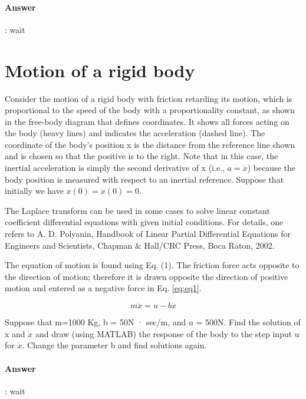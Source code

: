 \documentclass{article}
\begin{document}
\paragraph{Answer}:
wait

\section{Motion of a rigid body}

Consider the motion of a rigid body with friction retarding its motion, which is proportional to the speed of the body with a proportionality constant, as shown in the free-body diagram that defines coordinates. It shows all forces acting on the body (heavy lines) and indicates the acceleration (dashed line). The coordinate of the body's position x is the distance from the reference line shown and is chosen so that the positive is to the right. Note that in this case, the inertial acceleration is simply the second derivative of x (i.e., $a = \ddot{x}$) because the body position is measured with respect to an inertial reference. Suppose that initially we have $x(0) = \dot{x}(0) = 0$.

\begin{tcolorbox}
  The Laplace transform can be used in some cases to solve linear constant coeﬀicient differential equations with given initial conditions. For details, one refers to A. D. Polyanin, Handbook of Linear Partial Differential Equations for Engineers and Scientists, Chapman \& Hall/CRC Press, Boca Raton, 2002.
\end{tcolorbox}

The equation of motion is found using Eq. (1). The friction force acts opposite to the direction of motion; therefore it is drawn opposite the direction of positive motion and entered as a negative force in Eq. \eqref{eq:eq1}.

\begin{equation}
  m\ddot{x} = u - b\dot{x}
  \label{eq:eq1}
\end{equation}

Suppose that m=1000 Kg, b = 50N · sec/m, and u = 500N. Find the solution of x and $\dot{x}$ and draw (using MATLAB) the response of the body to the step input u for $\dot{x}$. Change the parameter b and find solutions again.

\paragraph{Answer}:
wait
\end{document}
